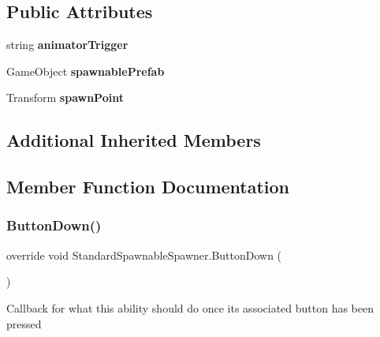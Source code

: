 \subsection*{Public Attributes}
\begin{DoxyCompactItemize}
\item 
\hypertarget{class_standard_spawnable_spawner_a6962859e16681ee6db6050c507e42e3a}{}\label{class_standard_spawnable_spawner_a6962859e16681ee6db6050c507e42e3a} 
string {\bfseries animator\+Trigger}
\item 
\hypertarget{class_standard_spawnable_spawner_a1199a034e39d1048e483df2ee1092468}{}\label{class_standard_spawnable_spawner_a1199a034e39d1048e483df2ee1092468} 
Game\+Object {\bfseries spawnable\+Prefab}
\item 
\hypertarget{class_standard_spawnable_spawner_a2ba38ff764b01f11808307a38c134a6d}{}\label{class_standard_spawnable_spawner_a2ba38ff764b01f11808307a38c134a6d} 
Transform {\bfseries spawn\+Point}
\end{DoxyCompactItemize}
\subsection*{Additional Inherited Members}


\subsection{Member Function Documentation}
\hypertarget{class_standard_spawnable_spawner_a1762d2f6a8bf3264b7316462648729a1}{}\label{class_standard_spawnable_spawner_a1762d2f6a8bf3264b7316462648729a1} 
\subsubsection{\texorpdfstring{Button\+Down()}{ButtonDown()}}
{\footnotesize\ttfamily override void Standard\+Spawnable\+Spawner.\+Button\+Down (\begin{DoxyParamCaption}{ }\end{DoxyParamCaption})\hspace{0.3cm}{\ttfamily [virtual]}}



Callback for what this ability should do once its associated button has been pressed 



